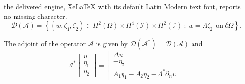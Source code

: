 \documentclass[10pt,a4paper]{amsart}
\begin{document}
the delivered engine, XeLaTeX with its default Latin Modern text font, reports no missing character.
\begin{equation}\label{non-b-opDomain}
\mathcal{D}(\mathcal{A})=\left\{(w,\zeta_1,\zeta_2)\in H^2(\Omega)\times H^4(\mathcal{I})\times H^2(\mathcal{I})~:~w=\Lambda \zeta_2~~\text{on}~\partial\Omega\right \}.
\end{equation}

\begin{proposition} 
    The adjoint of the operator $\mathcal{A}$ is given by $\mathcal{D}(\mathcal{A}^*)=\mathcal{D}(\mathcal{A})$ and 
    \begin{equation}\label{non-b-op-adj}
\mathcal{A}^*\begin{bmatrix}
u\\
\eta_1\\
\eta_2
\end{bmatrix}=\begin{bmatrix}
  \Delta u\\
  -\eta_2\\
  A_1\eta_1-A_2\eta_2-\Lambda^*\partial_n u
\end{bmatrix}.
\end{equation}
\end{proposition}
\end{document}
